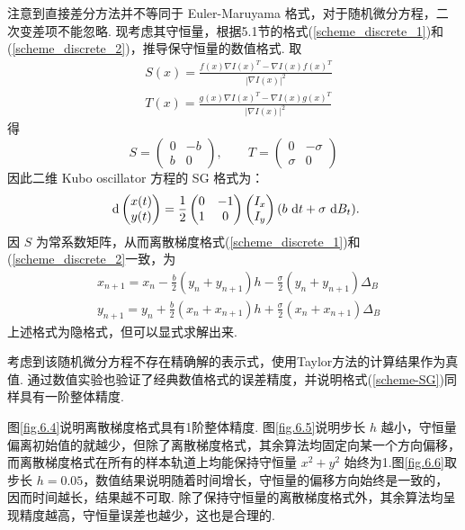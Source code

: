 注意到直接差分方法并不等同于 Euler-Maruyama 格式，对于随机微分方程，二次变差项不能忽略. 
现考虑其守恒量，根据5.1节的格式(\ref{scheme_discrete_1})和(\ref{scheme_discrete_2})，推导保守恒量的数值格式. 取 
\[
\begin{aligned}
&S(x) =  \frac{f(x) \nabla I(x)^T - \nabla I(x) f(x)^T}{|\nabla I(x)|^2} \\
&T(x) =  \frac{g(x) \nabla I(x)^T - \nabla I(x) g(x)^T}{|\nabla I(x)|^2} 
\end{aligned}
\]
得
\[
S = \begin{pmatrix} 0&-b\\b&0\end{pmatrix}, \qquad
T = \begin{pmatrix} 0&-\sigma\\\sigma&0\end{pmatrix}
\]
因此二维 Kubo oscillator 方程的 SG 格式为：
\begin{equation}
	\text{ d} \begin{pmatrix} x(t) \\ y(t)	\end{pmatrix} = \frac12
	\begin{pmatrix} 0&-1 \\  1&0	\end{pmatrix} 
	\begin{pmatrix} I_x \\ I_y	\end{pmatrix} (b \text{ d} t + \sigma \text{ d} B_t).
\end{equation}
因 $S$ 为常系数矩阵，从而离散梯度格式(\ref{scheme_discrete_1})和(\ref{scheme_discrete_2}一致，为
\begin{equation}\label{scheme-SG}
\begin{aligned}
	&x_{n+1} = x_n - \frac b2(y_n+y_{n+1})h -\frac \sigma 2 (y_n+y_{n+1}) \Delta_B\\
	&y_{n+1} = y_n + \frac b2(x_n+x_{n+1})h +\frac \sigma 2 (x_n+x_{n+1}) \Delta_B
\end{aligned}
\end{equation}
上述格式为隐格式，但可以显式求解出来. 

考虑到该随机微分方程不存在精确解的表示式，使用Taylor方法的计算结果作为真值. 通过数值实验也验证了经典数值格式的误差精度，并说明格式(\ref{scheme-SG})同样具有一阶整体精度.

图\ref{fig.6.4}说明离散梯度格式具有1阶整体精度. 图\ref{fig.6.5}说明步长 $h$ 越小，守恒量偏离初始值的就越少，但除了离散梯度格式，其余算法均固定向某一个方向偏移，而离散梯度格式在所有的样本轨道上均能保持守恒量 $x^2+y^2$ 始终为1.图\ref{fig.6.6}取步长 $h=0.05$，数值结果说明随着时间增长，守恒量的偏移方向始终是一致的，因而时间越长，结果越不可取. 除了保持守恒量的离散梯度格式外，其余算法均呈现精度越高，守恒量误差也越少，这也是合理的. 

